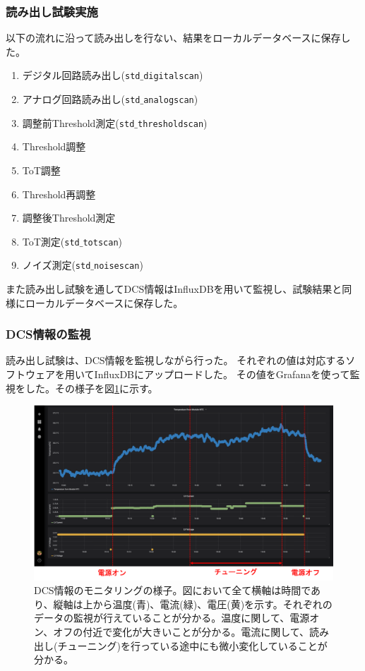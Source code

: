 
\clearpage
\subsubsection{読み出し試験実施}
以下の流れに沿って読み出しを行ない、結果をローカルデータベースに保存した。
\begin{enumerate}
  \item デジタル回路読み出し(\texttt{std$\_$digitalscan})
  \item アナログ回路読み出し(\texttt{std$\_$analogscan})
  \item 調整前Threshold測定(\texttt{std$\_$thresholdscan})
  \item Threshold調整
  \item ToT調整
  \item Threshold再調整
  \item 調整後Threshold測定
  \item ToT測定(\texttt{std$\_$totscan})
  \item ノイズ測定(\texttt{std$\_$noisescan})
\end{enumerate}

また読み出し試験を通してDCS情報はInfluxDBを用いて監視し、試験結果と同様にローカルデータベースに保存した。

\subsubsection{DCS情報の監視}
読み出し試験は、DCS情報を監視しながら行った。
それぞれの値は対応するソフトウェアを用いてInfluxDBにアップロードした。
その値をGrafanaを使って監視をした。その様子を図\ref{demo_monitor_dcs}に示す。

\begin{figure}[bpt]\centering
\includegraphics[width=15cm]{./demo_monitor_dcs.png}
\caption[DCS情報のモニタリングの様子]{DCS情報のモニタリングの様子。図において全て横軸は時間であり、縦軸は上から温度(青)、電流(緑)、電圧(黄)を示す。それぞれのデータの監視が行えていることが分かる。温度に関して、電源オン、オフの付近で変化が大きいことが分かる。電流に関して、読み出し(チューニング)を行っている途中にも微小変化していることが分かる。}
\label{demo_monitor_dcs}
\end{figure}

